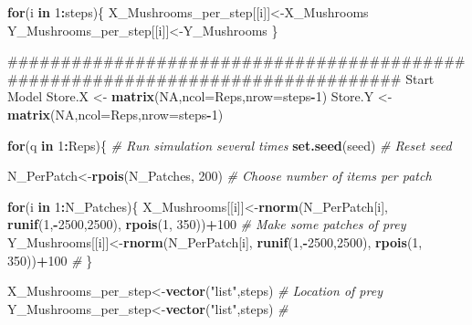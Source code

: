 \documentclass[]{article}
\newenvironment{Shaded}{\begin{snugshade}}{\end{snugshade}}
\newcommand{\KeywordTok}[1]{\textcolor[rgb]{0.13,0.29,0.53}{\textbf{#1}}}
\newcommand{\DataTypeTok}[1]{\textcolor[rgb]{0.13,0.29,0.53}{#1}}
\newcommand{\DecValTok}[1]{\textcolor[rgb]{0.00,0.00,0.81}{#1}}
\newcommand{\StringTok}[1]{\textcolor[rgb]{0.31,0.60,0.02}{#1}}
\newcommand{\CommentTok}[1]{\textcolor[rgb]{0.56,0.35,0.01}{\textit{#1}}}
\newcommand{\OtherTok}[1]{\textcolor[rgb]{0.56,0.35,0.01}{#1}}
\newcommand{\ControlFlowTok}[1]{\textcolor[rgb]{0.13,0.29,0.53}{\textbf{#1}}}
\newcommand{\OperatorTok}[1]{\textcolor[rgb]{0.81,0.36,0.00}{\textbf{#1}}}
\newcommand{\NormalTok}[1]{#1}
\begin{document}
\begin{Shaded}
\begin{Highlighting}[]
\ControlFlowTok{for}\NormalTok{(i }\ControlFlowTok{in} \DecValTok{1}\OperatorTok{:}\NormalTok{steps)\{}
\NormalTok{ X_Mushrooms_per_step[[i]]<-X_Mushrooms}
\NormalTok{ Y_Mushrooms_per_step[[i]]<-Y_Mushrooms}
\NormalTok{\}                                                                 }
                                                                                     
\NormalTok{################################################################################ Start Model}
\NormalTok{Store.X <-}\StringTok{ }\KeywordTok{matrix}\NormalTok{(}\OtherTok{NA}\NormalTok{,}\DataTypeTok{ncol=}\NormalTok{Reps,}\DataTypeTok{nrow=}\NormalTok{steps}\OperatorTok{-}\DecValTok{1}\NormalTok{)}
\NormalTok{Store.Y <-}\StringTok{ }\KeywordTok{matrix}\NormalTok{(}\OtherTok{NA}\NormalTok{,}\DataTypeTok{ncol=}\NormalTok{Reps,}\DataTypeTok{nrow=}\NormalTok{steps}\OperatorTok{-}\DecValTok{1}\NormalTok{)}

\ControlFlowTok{for}\NormalTok{(q }\ControlFlowTok{in} \DecValTok{1}\OperatorTok{:}\NormalTok{Reps)\{                                                               }\CommentTok{# Run simulation several times}
\KeywordTok{set.seed}\NormalTok{(seed)                                                                  }\CommentTok{# Reset seed}

\NormalTok{N_PerPatch<-}\KeywordTok{rpois}\NormalTok{(N_Patches, }\DecValTok{200}\NormalTok{)                                               }\CommentTok{# Choose number of items per patch}

\ControlFlowTok{for}\NormalTok{(i }\ControlFlowTok{in} \DecValTok{1}\OperatorTok{:}\NormalTok{N_Patches)\{}
\NormalTok{X_Mushrooms[[i]]<-}\KeywordTok{rnorm}\NormalTok{(N_PerPatch[i], }\KeywordTok{runif}\NormalTok{(}\DecValTok{1}\NormalTok{,}\OperatorTok{-}\DecValTok{2500}\NormalTok{,}\DecValTok{2500}\NormalTok{), }\KeywordTok{rpois}\NormalTok{(}\DecValTok{1}\NormalTok{, }\DecValTok{350}\NormalTok{))}\OperatorTok{+}\DecValTok{100}  \CommentTok{# Make some patches of prey}
\NormalTok{Y_Mushrooms[[i]]<-}\KeywordTok{rnorm}\NormalTok{(N_PerPatch[i], }\KeywordTok{runif}\NormalTok{(}\DecValTok{1}\NormalTok{,}\OperatorTok{-}\DecValTok{2500}\NormalTok{,}\DecValTok{2500}\NormalTok{), }\KeywordTok{rpois}\NormalTok{(}\DecValTok{1}\NormalTok{, }\DecValTok{350}\NormalTok{))}\OperatorTok{+}\DecValTok{100}  \CommentTok{#}
\NormalTok{\}}

\NormalTok{X_Mushrooms_per_step<-}\KeywordTok{vector}\NormalTok{(}\StringTok{"list"}\NormalTok{,steps)                                      }\CommentTok{# Location of prey}
\NormalTok{Y_Mushrooms_per_step<-}\KeywordTok{vector}\NormalTok{(}\StringTok{"list"}\NormalTok{,steps)                                      }\CommentTok{#}


\end{Highlighting}
\end{Shaded}
\end{document}
